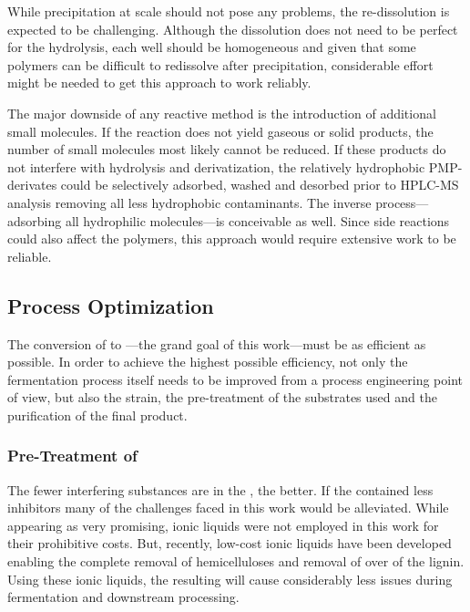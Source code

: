 While precipitation at  scale should not pose any problems, the re-dissolution is expected to be challenging. Although the dissolution does not need to be perfect for the hydrolysis, each well should be homogeneous and given that some polymers can be difficult to redissolve after precipitation, considerable effort might be needed to get this approach to work reliably.

The major downside of any reactive method is the introduction of additional small molecules. If the reaction does not yield gaseous or solid products, the number of small molecules most likely cannot be reduced. If these products do not interfere with hydrolysis and derivatization, the relatively hydrophobic PMP-derivates could be selectively adsorbed, washed and desorbed prior to HPLC-MS analysis removing all less hydrophobic contaminants. The inverse process---adsorbing all hydrophilic molecules---is conceivable as well. Since side reactions could also affect the polymers, this approach would require extensive work to be reliable.

\subsection{Process Optimization}
The conversion of \lch{} to \eps{}---the grand goal of this work---must be as efficient as possible. In order to achieve the highest possible efficiency, not only the fermentation process itself needs to be improved from a process engineering point of view, but also the strain, the pre-treatment of the substrates used and the purification of the final product.

\subsubsection{Pre-Treatment of \LCH{}}
The fewer interfering substances are in the \lch{}, the better. If the \lch{} contained less inhibitors many of the challenges faced in this work would be alleviated. While appearing as very promising, ionic liquids were not employed in this work for their prohibitive costs. But, recently, low-cost ionic liquids have been developed enabling the complete removal of hemicelluloses and removal of over  of the lignin. \cite{Gschwend2017} Using these ionic liquids, the resulting \lch{} will cause considerably less issues during fermentation and downstream processing.

